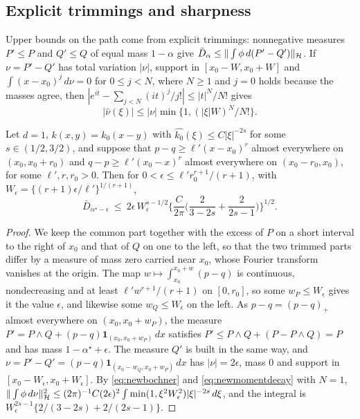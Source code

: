 \subsection{Explicit trimmings and sharpness}

Upper bounds on the path come from explicit trimmings: nonnegative measures $P'\le P$ and $Q'\le Q$ of equal mass
$1-\alpha$ give $\bar D_{\alpha}\le\|\int\phi\,d(P'-Q')\|_{\mathcal{H}}$. If $\nu=P'-Q'$ has total variation $|\nu|$, support in $[x_0-W,x_0+W]$
and $\int(x-x_0)^j\,d\nu=0$ for $0\le j<N$, where $N\ge1$ and $j=0$ holds because the masses agree, then
$|e^{it}-\sum_{j<N}(it)^j/j!|\le|t|^N/N!$ gives
\begin{equation}
|\widehat\nu(\xi)|\le|\nu|\min\{1,(|\xi|W)^N/N!\} .
\label{eq:newmomentdecay}
\end{equation}

\begin{proposition}
\label{prop:newupperone}
Let $d=1$, $k(x,y)=k_0(x-y)$ with $\widehat{k_0}(\xi)\le C|\xi|^{-2s}$ for some $s\in(1/2,3/2)$, and suppose that
$p-q\ge\ell'(x-x_0)^r$ almost everywhere on $(x_0,x_0+r_0)$ and $q-p\ge\ell'(x_0-x)^r$ almost everywhere on $(x_0-r_0,x_0)$,
for some $\ell',r,r_0>0$. Then for $0<\epsilon\le\ell'r_0^{r+1}/(r+1)$, with $W_\epsilon=\{(r+1)\epsilon/\ell'\}^{1/(r+1)}$,
\[
\bar D_{\alpha^\star-\epsilon}\ \le\ 2\epsilon\,W_\epsilon^{s-1/2}\Big\{\frac C{2\pi}\Big(\frac2{3-2s}+\frac2{2s-1}\Big)\Big\}^{1/2} .
\]
\end{proposition}

\begin{proof}
We keep the common part together with the excess of $P$ on a short interval to the right of $x_0$ and that of $Q$ on
one to the left, so that the two trimmed parts differ by a measure of mass zero carried near $x_0$, whose Fourier
transform vanishes at the origin. The map $w\mapsto\int_{x_0}^{x_0+w}(p-q)$ is continuous, nondecreasing and at least $\ell'w^{r+1}/(r+1)$ on $[0,r_0]$, so some
$w_P\le W_\epsilon$ gives it the value $\epsilon$, and likewise some $w_Q\le W_\epsilon$ on the left. As $p-q=(p-q)_+$ almost everywhere
on $(x_0,x_0+w_P)$, the measure $P'=P\wedge Q+(p-q)\mathbf 1_{(x_0,x_0+w_P)}\,dx$ satisfies $P'\le P\wedge Q+(P-P\wedge Q)=P$ and has mass
$1-\alpha^\star+\epsilon$. The measure $Q'$ is built in the same way, and $\nu=P'-Q'=(p-q)\mathbf 1_{(x_0-w_Q,x_0+w_P)}\,dx$ has $|\nu|=2\epsilon$, mass
$0$ and support in $[x_0-W_\epsilon,x_0+W_\epsilon]$. By \eqref{eq:newbochner} and \eqref{eq:newmomentdecay} with $N=1$,
$\|\int\phi\,d\nu\|_{\mathcal{H}}^2\le(2\pi)^{-1}C(2\epsilon)^2\int\min(1,\xi^2W_\epsilon^2)|\xi|^{-2s}\,d\xi$, and the integral is
$W_\epsilon^{2s-1}\{2/(3-2s)+2/(2s-1)\}$.
\end{proof}

